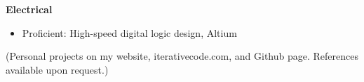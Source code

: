 \documentclass[10pt,letterpaper,margin]{res}
\begin{document}
\begin{resume}
{\bf Electrical}\vspace{0.0em}

\begin{itemize}
    \item Proficient: High-speed digital logic design, Altium
\end{itemize}


\vspace{0.5em}
{\footnotesize (Personal projects on my website, iterativecode.com, and Github
page. References available upon request.)}

% 

\end{resume}



% 
% 
\end{document}
